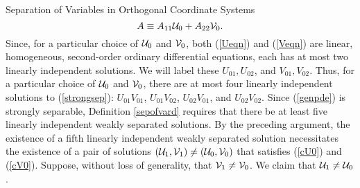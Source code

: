 \begin{section}{Separation of Variables in Orthogonal Coordinate Systems}
\begin{equation}
\label{Aequals0}
A \equiv A_{11} \mathcal{U}_0 + A_{22} \mathcal{V}_0.
\end{equation}
Since, for a particular choice of $\mathcal{U}_0$ and $\mathcal{V}_0$, both (\ref{Ueqn}) and (\ref{Veqn}) are linear, homogeneous, second-order ordinary differential equations, each has at most two linearly independent solutions.  We will label these $U_{01}, U_{02}$, and $V_{01}, V_{02}$.  Thus, for a particular choice of $\mathcal{U}_0$ and $\mathcal{V}_0$, there are at most four linearly independent solutions to (\ref{strongsep}): $U_{01}V_{01}$, $U_{01}V_{02}$, $U_{02}V_{01}$, and $U_{02}V_{02}$.  Since (\ref{genpde}) is strongly separable, Definition \ref{sepofvard} requires that there be at least five linearly independent weakly separated solutions.  By the preceding argument, the existence of a fifth linearly independent weakly separated solution necessitates the existence of a pair of solutions $(\mathcal{U}_1,\mathcal{V}_1) \not= (\mathcal{U}_0,\mathcal{V}_0)$ that satisfies (\ref{cU0}) and (\ref{cV0}).  Suppose, without loss of generality, that $\mathcal{V}_1 \not= \mathcal{V}_0$.  We claim that $\mathcal{U}_1 \not= \mathcal{U}_0$.


\end{section}
